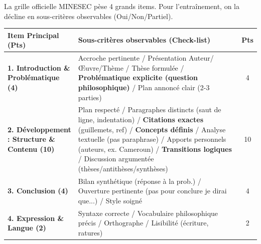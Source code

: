 \documentclass[11pt]{article}
\begin{document}
\begin{definition}
La grille officielle MINESEC p\`ese 4 grands items. Pour l'entra\^inement, on la d\'ecline en sous-crit\`eres observables (Oui/Non/Partiel).
\begin{center}
\begin{tabularx}{\linewidth}{|l|X|c|}\hline
\textbf{Item Principal (Pts)} & \textbf{Sous-crit\`eres observables (Check-list)} & \textbf{Pts} \\ \hline
\textbf{1. Introduction \& Probl\'ematique (4)} & Accroche pertinente / Pr\'esentation Auteur/\OE uvre/Th\`eme / Th\`ese formul\'ee / \textbf{Probl\'ematique explicite (question philosophique)} / Plan annonc\'e clair (2-3 parties) & 4 \\ \hline
\textbf{2. D\'eveloppement : Structure \& Contenu (10)} & Plan respect\'e / Paragraphes distincts (saut de ligne, indentation) / \textbf{Citations exactes} (guillemets, ref) / \textbf{Concepts d\'efinis} / Analyse textuelle (pas paraphrase) / Apports personnels (auteurs, ex. Cameroun) / \textbf{Transitions logiques} / Discussion argument\'ee (th\`eses/antith\`eses/synth\`eses) & 10 \\ \hline
\textbf{3. Conclusion (4)} & Bilan synth\'etique (r\'eponse \`a la prob.) / Ouverture pertinente (pas \og{}pour conclure je dirai que...\fg{}) / Style soign\'e & 4 \\ \hline
\textbf{4. Expression \& Langue (2)} & Syntaxe correcte / Vocabulaire philosophique pr\'ecis / Orthographe / Lisibilit\'e (\'ecriture, ratures) & 2 \\ \hline
\end{tabularx}
\end{center}
\end{definition}
\end{document}
